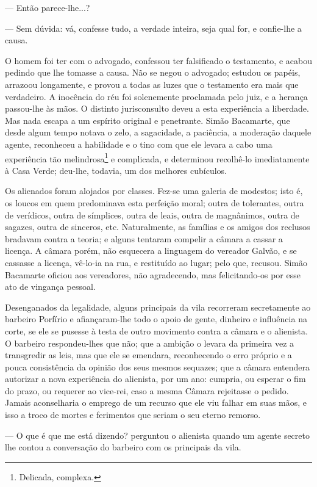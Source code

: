 --- Então parece-lhe...?

--- Sem dúvida: vá, confesse tudo, a verdade inteira, seja qual for, e
confie-lhe a causa.

O homem foi ter com o advogado, confessou ter falsificado o testamento,
e acabou pedindo que lhe tomasse a causa. Não se negou o advogado;
estudou os papéis, arrazoou longamente, e provou a todas as luzes que o
testamento era mais que verdadeiro. A inocência do réu foi solenemente
proclamada pelo juiz, e a herança passou-lhe às mãos. O distinto
jurisconsulto deveu a esta experiência a liberdade. Mas nada escapa a um
espírito original e penetrante. Simão Bacamarte, que desde algum tempo
notava o zelo, a sagacidade, a paciência, a moderação daquele agente,
reconheceu a habilidade e o tino com que ele levara a cabo uma
experiência tão melindrosa\footnote{Delicada, complexa.} e complicada, e
determinou recolhê-lo imediatamente à Casa Verde; deu-lhe, todavia, um
dos melhores cubículos.

Os alienados foram alojados por classes. Fez-se uma galeria de modestos;
isto é, os loucos em quem predominava esta perfeição moral; outra de
tolerantes, outra de verídicos, outra de símplices, outra de leais,
outra de magnânimos, outra de sagazes, outra de sinceros, etc.
Naturalmente, as famílias e os amigos dos reclusos bradavam contra a
teoria; e alguns tentaram compelir a câmara a cassar a licença. A câmara
porém, não esquecera a linguagem do vereador Galvão, e se cassasse a
licença, vê-lo-ia na rua, e restituído ao lugar; pelo que, recusou.
Simão Bacamarte oficiou aos vereadores, não agradecendo, mas
felicitando-os por esse ato de vingança pessoal.

Desenganados da legalidade, alguns principais da vila recorreram
secretamente ao barbeiro Porfírio e afiançaram-lhe todo o apoio de
gente, dinheiro e influência na corte, se ele se pusesse à testa de
outro movimento contra a câmara e o alienista. O barbeiro respondeu-lhes
que não; que a ambição o levara da primeira vez a transgredir as leis,
mas que ele se emendara, reconhecendo o erro próprio e a pouca
consistência da opinião dos seus mesmos sequazes; que a câmara entendera
autorizar a nova experiência do alienista, por um ano: cumpria, ou
esperar o fim do prazo, ou requerer ao vice-rei, caso a mesma Câmara
rejeitasse o pedido. Jamais aconselharia o emprego de um recurso que ele
viu falhar em suas mãos, e isso a troco de mortes e ferimentos que
seriam o seu eterno remorso.

--- O que é que me está dizendo? perguntou o alienista quando um agente
secreto lhe contou a conversação do barbeiro com os principais da vila.

